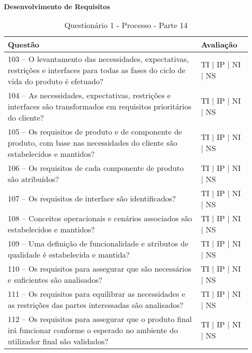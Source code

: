 \documentclass[openany,10pt,a4paper]{article}
\begin{document}
\begin{longtable}
\begin{appendix}
\begin{table}[h]
\textbf{Desenvolvimento de Requisitos}
	\centering
	\caption{Questionário 1 - Processo - Parte 14}
	\begin{tabular}{p{3.5in}p{2in}}		
		\toprule
		\textbf{Questão}  & \textbf{Avaliação}\\ 
		\midrule
		103 – O levantamento das necessidades, expectativas, restrições e interfaces para todas as fases 
do ciclo de vida do produto é efetuado?
 & TI | IP | NI | NS \\
        \midrule
		104 – As necessidades, expectativas, restrições e interfaces são transformados em requisitos 
prioritários do cliente?
 & TI | IP | NI | NS \\
		\midrule
		105 – Os requisitos de produto e de componente de produto, com base nas necessidades do 
cliente são estabelecidos e mantidos?
 & TI | IP | NI | NS \\
		\midrule
        106 – Os requisitos de cada componente de produto são atribuídos?
 & TI | IP | NI | NS \\
		\midrule
		107 – Os requisitos de interface são identificados?
  & TI | IP | NI | NS \\
		\midrule
		108 – Conceitos operacionais e cenários associados são estabelecidos e mantidos?
 & TI | IP | NI | NS \\
 \midrule
		109 – Uma definição de funcionalidade e atributos de qualidade é estabelecida e mantida?
 & TI | IP | NI | NS \\
 \midrule
	110 – Os requisitos para assegurar que são necessários e suficientes são analisados?
 & TI | IP | NI | NS \\
 \midrule
		111 – Os requisitos para equilibrar as necessidades e as restrições das partes interessadas são 
analisados?
 & TI | IP | NI | NS \\
        \midrule
		112 – Os requisitos para assegurar que o produto final irá funcionar conforme o esperado no 
ambiente do utilizador final são validados?
 & TI | IP | NI | NS \\
		\bottomrule
	\end{tabular} 
	\label{tab:tabela1}
\end{table}


\end{appendix}
\end{longtable}
\end{document}
